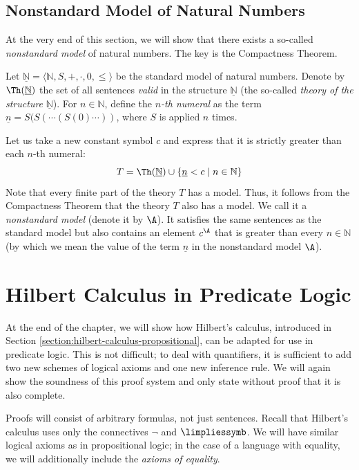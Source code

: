 \subsection{Nonstandard Model of Natural Numbers}

At the very end of this section, we will show that there exists a so-called \emph{nonstandard model} of natural numbers. The key is the Compactness Theorem.
    
Let $\underline{\mathbb N}=\langle\mathbb N,S,+,\cdot,0,\leq\rangle$ be the standard model of natural numbers. Denote by $\Th(\underline{\mathbb N})$ the set of all sentences \emph{valid} in the structure $\underline{\mathbb N}$ (the so-called \emph{theory of the structure} $\underline{\mathbb N}$). For $n\in \mathbb N$, define the \emph{$n$-th numeral} as the term $\underline n=S(S(\cdots (S(0)\cdots))$, where $S$ is applied $n$ times.

Let us take a new constant symbol $c$ and express that it is strictly greater than each $n$-th numeral:
$$
T=\Th(\underline{\mathbb N})\cup\{\underline n<c\mid n\in \mathbb N\}
$$
Note that every finite part of the theory $T$ has a model. Thus, it follows from the Compactness Theorem that the theory $T$ also has a model. We call it a \emph{nonstandard model} (denote it by $\A$). It satisfies the same sentences as the standard model but also contains an element $c^\A$ that is greater than every $n\in \mathbb N$ (by which we mean the value of the term $\underline n$ in the nonstandard model $\A$).
    

\section{Hilbert Calculus in Predicate Logic}

At the end of the chapter, we will show how Hilbert's calculus, introduced in Section \ref{section:hilbert-calculus-propositional}, can be adapted for use in predicate logic. This is not difficult; to deal with quantifiers, it is sufficient to add two new schemes of logical axioms and one new inference rule. We will again show the soundness of this proof system and only state without proof that it is also complete.

Proofs will consist of arbitrary formulas, not just sentences. Recall that Hilbert's calculus uses only the connectives $\neg$ and $\limpliessymb$. We will have similar logical axioms as in propositional logic; in the case of a language with equality, we will additionally include the \emph{axioms of equality}. 

